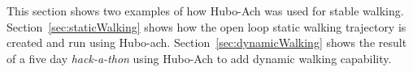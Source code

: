 This section shows two examples of how Hubo-Ach was used for stable walking.  
Section~\ref{sec:staticWalking} shows how the open loop static walking trajectory is created and run using Hubo-ach.
Section~\ref{sec:dynamicWalking} shows the result of a five day \textit{hack-a-thon} using Hubo-Ach to add dynamic walking capability.  
